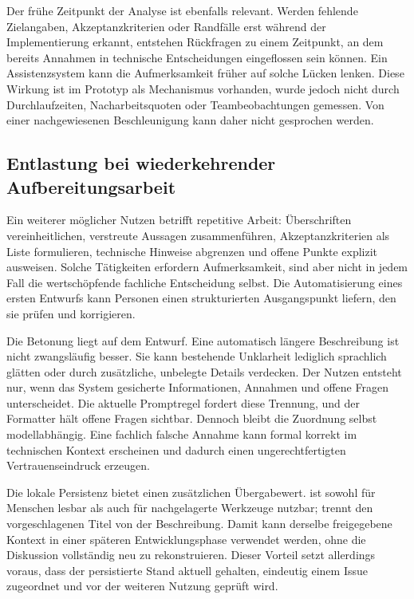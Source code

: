 Der frühe Zeitpunkt der Analyse ist ebenfalls relevant. Werden fehlende Zielangaben, Akzeptanzkriterien oder Randfälle erst während der Implementierung erkannt, entstehen Rückfragen zu einem Zeitpunkt, an dem bereits Annahmen in technische Entscheidungen eingeflossen sein können. Ein Assistenzsystem kann die Aufmerksamkeit früher auf solche Lücken lenken. Diese Wirkung ist im Prototyp als Mechanismus vorhanden, wurde jedoch nicht durch Durchlaufzeiten, Nacharbeitsquoten oder Teambeobachtungen gemessen. Von einer nachgewiesenen Beschleunigung kann daher nicht gesprochen werden.

\subsection{Entlastung bei wiederkehrender Aufbereitungsarbeit}

Ein weiterer möglicher Nutzen betrifft repetitive Arbeit: Überschriften vereinheitlichen, verstreute Aussagen zusammenführen, Akzeptanzkriterien als Liste formulieren, technische Hinweise abgrenzen und offene Punkte explizit ausweisen. Solche Tätigkeiten erfordern Aufmerksamkeit, sind aber nicht in jedem Fall die wertschöpfende fachliche Entscheidung selbst. Die Automatisierung eines ersten Entwurfs kann Personen einen strukturierten Ausgangspunkt liefern, den sie prüfen und korrigieren.

Die Betonung liegt auf dem Entwurf. Eine automatisch längere Beschreibung ist nicht zwangsläufig besser. Sie kann bestehende Unklarheit lediglich sprachlich glätten oder durch zusätzliche, unbelegte Details verdecken. Der Nutzen entsteht nur, wenn das System gesicherte Informationen, Annahmen und offene Fragen unterscheidet. Die aktuelle Promptregel fordert diese Trennung, und der Formatter hält offene Fragen sichtbar. Dennoch bleibt die Zuordnung selbst modellabhängig. Eine fachlich falsche Annahme kann formal korrekt im technischen Kontext erscheinen und dadurch einen ungerechtfertigten Vertrauenseindruck erzeugen.

Die lokale Persistenz bietet einen zusätzlichen Übergabewert.  ist sowohl für Menschen lesbar als auch für nachgelagerte Werkzeuge nutzbar;  trennt den vorgeschlagenen Titel von der Beschreibung. Damit kann derselbe freigegebene Kontext in einer späteren Entwicklungsphase verwendet werden, ohne die Diskussion vollständig neu zu rekonstruieren. Dieser Vorteil setzt allerdings voraus, dass der persistierte Stand aktuell gehalten, eindeutig einem Issue zugeordnet und vor der weiteren Nutzung geprüft wird.

